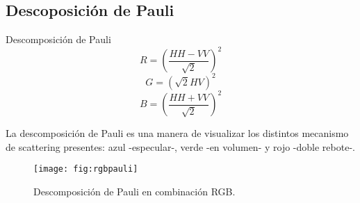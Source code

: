 
\subsection{Descoposición de Pauli}

\begin{frame}{} \vskip0cm
     \begin{block}{Descomposición de Pauli}
      \begin{equation}
        R = \left(\frac{HH-VV}{\sqrt{2}}\right)^2
      \end{equation}
      \begin{equation}
        G = \left(\sqrt{2}HV\right)^2
      \end{equation}
      \begin{equation}
        B = \left(\frac{HH+VV}{\sqrt{2}}\right)^2
      \end{equation}
     \end{block}
    La descomposición de Pauli es una manera de visualizar los distintos mecanismo de scattering presentes: azul -especular-, verde -en volumen- y rojo -doble rebote-.
\end{frame}

\begin{frame}{} \vskip0cm
  \begin{figure}
    \centering
    \texttt{[image: fig:rgbpauli]}
    \caption{Descomposición de Pauli en combinación RGB.}
    \label{}
  \end{figure}
\end{frame}


